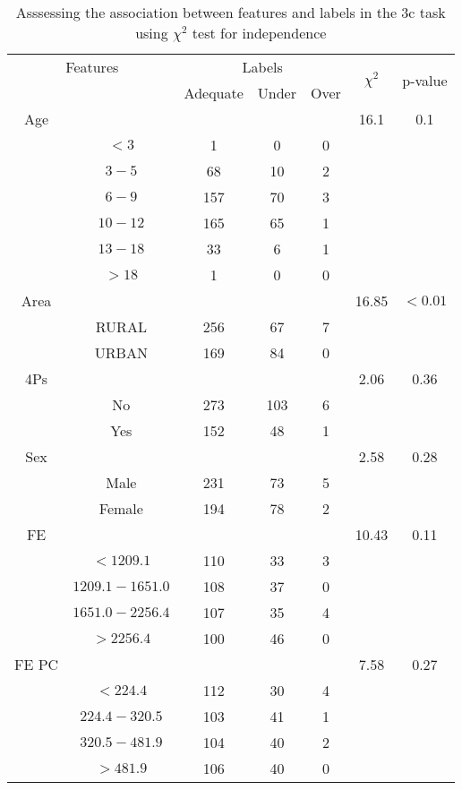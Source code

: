 \begin{table}[!htb]
\centering
\caption{Asssessing the association between features and labels in the 3c task using $\chi^2$ test for independence}
\label{tab:chitest_3c}
\begin{tabular}{c c | c c c| c | c}
\hline
\multicolumn{2}{c|}{Features}& \multicolumn{3}{c|}{Labels}& \multirow{2}{*}{$\chi^2$} & \multirow{2}{*}{p-value}\\ 
& & Adequate & Under & Over & & \\ 
\hline
Age &  &  &  & & 16.1 & 0.1 \\ 
& $< 3$ & 1 & 0 & 0& & \\ 
& $3-5$ & 68 & 10 & 2& & \\ 
& $6-9$ & 157 & 70 & 3& & \\ 
& $10-12$ & 165 & 65 & 1& & \\ 
& $13-18$ & 33 & 6 & 1& & \\ 
& $> 18$ & 1 & 0 & 0& & \\ 
\hline 
Area &  &  &  & & 16.85 & $< 0.01$ \\ 
& RURAL & 256 & 67 & 7& & \\ 
& URBAN & 169 & 84 & 0& & \\ 
\hline 
4Ps &  &  &  & & 2.06 & 0.36 \\ 
& No & 273 & 103 & 6& & \\ 
& Yes & 152 & 48 & 1& & \\ 
\hline 
Sex &  &  &  & & 2.58 & 0.28 \\ 
& Male & 231 & 73 & 5& & \\ 
& Female & 194 & 78 & 2& & \\ 
\hline 
FE &  &  &  & & 10.43 & 0.11 \\ 
& $< 1209.1$ & 110 & 33 & 3& & \\ 
& $1209.1-1651.0$ & 108 & 37 & 0& & \\ 
& $1651.0-2256.4$ & 107 & 35 & 4& & \\ 
& $> 2256.4$ & 100 & 46 & 0& & \\ 
\hline 
FE PC &  &  &  & & 7.58 & 0.27 \\ 
& $< 224.4$ & 112 & 30 & 4& & \\ 
& $224.4-320.5$ & 103 & 41 & 1& & \\ 
& $320.5-481.9$ & 104 & 40 & 2& & \\ 
& $> 481.9$ & 106 & 40 & 0& & \\ 
\hline 
\end{tabular}
\end{table}
